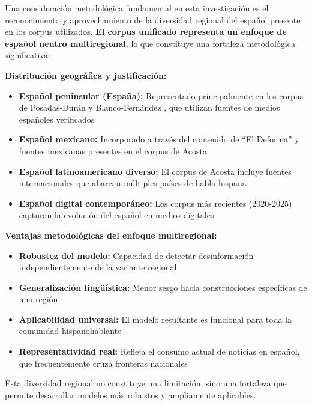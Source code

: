 Una consideración metodológica fundamental en esta investigación es el reconocimiento y aprovechamiento de la diversidad regional del español presente en los corpus utilizados. \textbf{El corpus unificado representa un enfoque de español neutro multiregional}, lo que constituye una fortaleza metodológica significativa:

\textbf{Distribución geográfica y justificación:}
\begin{itemize}
    \item \textbf{Español peninsular (España):} Representado principalmente en los corpus de Posadas-Durán \cite{posadas2019detection} y Blanco-Fernández \cite{blanco2024enhancing}, que utilizan fuentes de medios españoles verificados
    
    \item \textbf{Español mexicano:} Incorporado a través del contenido de ``El Deforma'' y fuentes mexicanas presentes en el corpus de Acosta \cite{acosta2019construccion}
    
    \item \textbf{Español latinoamericano diverso:} El corpus de Acosta incluye fuentes internacionales que abarcan múltiples países de habla hispana
    
    \item \textbf{Español digital contemporáneo:} Los corpus más recientes (2020-2025) capturan la evolución del español en medios digitales
\end{itemize}

\textbf{Ventajas metodológicas del enfoque multiregional:}
\begin{itemize}
    \item \textbf{Robustez del modelo:} Capacidad de detectar desinformación independientemente de la variante regional
    \item \textbf{Generalización lingüística:} Menor sesgo hacia construcciones específicas de una región
    \item \textbf{Aplicabilidad universal:} El modelo resultante es funcional para toda la comunidad hispanohablante
    \item \textbf{Representatividad real:} Refleja el consumo actual de noticias en español, que frecuentemente cruza fronteras nacionales
\end{itemize}

Esta diversidad regional no constituye una limitación, sino una fortaleza que permite desarrollar modelos más robustos y ampliamente aplicables.


